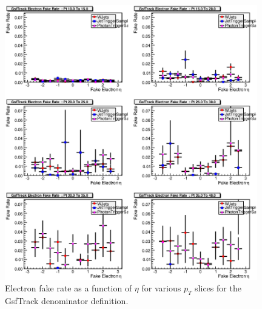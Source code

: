 \documentclass{cmspaper}
\begin{document}
\begin{figure}[htb]
\begin{center}
\includegraphics[width=0.98\textwidth]{plots/GsfTrackElectronFakeRatePtSlices.eps}
   \caption{Electron fake rate as a function of $\eta$ for various $p_T$ slices for the GsfTrack denominator definition. }
   \label{fig:electronFR_gsftrack_ptslices}
\end{center}
\end{figure}
\end{document}
